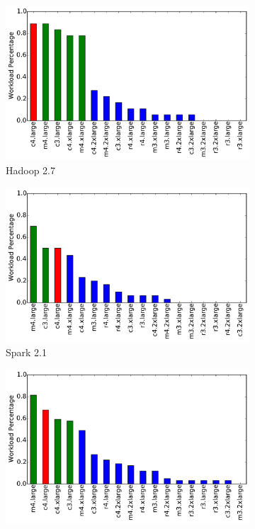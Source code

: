\begin{figure}[!htbp]
\centering
\begin{subfigure}[b]{0.5\textwidth}
    \includegraphics[width=\linewidth]{Figures/motivation_cost_hadoop_percentage.pdf}
    \caption{Hadoop 2.7}
    \label{fig:motivation_percentage_1}
\end{subfigure}
\begin{subfigure}[b]{0.5\textwidth}
    \includegraphics[width=\linewidth]{Figures/motivation_cost_spark_percentage.pdf}
    \caption{Spark 2.1}
    \label{fig:motivation_percentage_2}
\end{subfigure}
\begin{subfigure}[b]{0.5\textwidth}
    \includegraphics[width=\linewidth]{Figures/motivation_cost_spark1.5_percentage.pdf}

\end{subfigure}
\end{figure}
